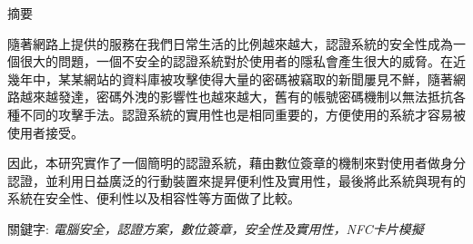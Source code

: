 

\doublespacing

%
\onehalfspacing

\begin{titlepage}
\begin{CJK}{UTF8}{bkai}
\begin{center}
\Large{{摘要}}\\
\end{center}

隨著網路上提供的服務在我們日常生活的比例越來越大，認證系統的安全性成為一個很大的問題，一個不安全的認證系統對於使用者的隱私會產生很大的威脅。在近幾年中，某某網站的資料庫被攻擊使得大量的密碼被竊取的新聞屢見不鮮，隨著網路越來越發達，密碼外洩的影響性也越來越大，舊有的帳號密碼機制以無法抵抗各種不同的攻擊手法。認證系統的實用性也是相同重要的，方便使用的系統才容易被使用者接受。

因此，本研究實作了一個簡明的認證系統，藉由數位簽章的機制來對使用者做身分認證，並利用日益廣泛的行動裝置來提昇便利性及實用性，最後將此系統與現有的系統在安全性、便利性以及相容性等方面做了比較。

\vspace*{5em}

{關鍵字:} \emph{電腦安全，認證方案，數位簽章，安全性及實用性，NFC卡片模擬}


\end{CJK}
\end{titlepage}

%
